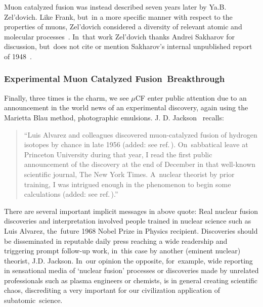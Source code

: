 \documentclass[particles,article,accept,pdftex,moreauthors]{Definitions/mdpi}
\begin{document}
Muon catalyzed fusion was instead described seven years later by Ya.B. Zel'dovich. Like Frank, but~in a more specific manner with respect to the properties of muons, Zel'dovich considered a diversity of relevant atomic and molecular processes~\cite{Zel:1954}. In~that work Zel'dovich thanks Andrei Sakharov for discussion, but~does not cite or mention Sakharov's internal unpublished report of 1948~\cite{Sakharov:1989P}.

\subsubsection{Experimental Muon Catalyzed Fusion~Breakthrough}\label{ssec:muCFexp}
Finally, three times is the charm, we see $\mu$CF enter public attention due to an announcement in the world news of an experimental discovery, again using the Marietta Blau method, photographic emulsions. J. D. Jackson~\cite{Jackson:2010Rem} recalls:
\begin{quote}
``Luis Alvarez and colleagues discovered muon-catalyzed fusion of hydrogen isotopes by chance in late 1956 (added: see ref.\,\cite{Alvarez:1957un}). On~sabbatical leave at Princeton University during that year, I read the first public announcement of the discovery at the end of December in that well-known scientific journal, The New York Times. A~nuclear theorist by prior training, I was intrigued enough in the phenomenon to begin some calculations (added: see ref.\,\cite{Jackson:2010Rem}).''
\end{quote}

There are several important implicit messages in above quote: Real nuclear fusion discoveries and interpretation involved people trained in nuclear science such as Luis Alvarez, the~future 1968 Nobel Prize in Physics recipient. Discoveries should be disseminated in reputable daily press reaching a wide readership and triggering prompt follow-up work, in~this case by another (eminent nuclear) theorist, J.D. Jackson. In~our opinion the opposite, for~example, wide reporting in sensational media of `nuclear fusion' processes or discoveries made by unrelated professionals such as plasma engineers or chemists, is in general creating scientific chaos, discrediting a very important for our civilization application of subatomic~science.
\end{document}

